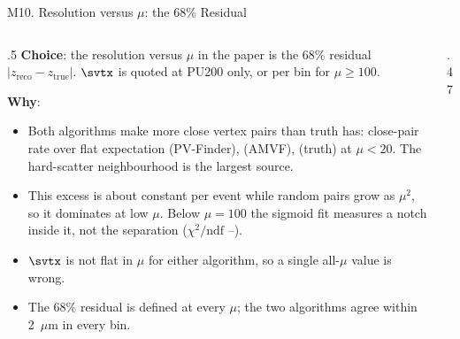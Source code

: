 \begin{frame}{M10. Resolution versus $\mu$: the 68\% Residual}
\footnotesize
\begin{columns}[T]
\begin{column}{.5\linewidth}
\textbf{Choice}: the resolution versus $\mu$ in the paper is the 68\% residual $|z_\mathrm{reco}-z_\mathrm{true}|$. $\svtx$ is quoted at PU200 only, or per bin for $\mu\ge100$.
\par\vspace{.4em}
\textbf{Why}:
\begin{itemize}\setlength\itemsep{.15em}
\item Both algorithms make more close vertex pairs than truth has: close-pair rate over flat expectation \rvmExcessPVF{} (PV-Finder), \rvmExcessAMVF{} (AMVF), \rvmExcessTruth{} (truth) at $\mu<20$. The hard-scatter neighbourhood is the largest source.
\item This excess is about constant per event while random pairs grow as $\mu^2$, so it dominates at low $\mu$. Below $\mu=100$ the sigmoid fit measures a notch inside it, not the separation ($\chi^2/\mathrm{ndf}$ \rvmChiLo--\rvmChiHi).
\item $\svtx$ is not flat in $\mu$ for either algorithm, so a single all-$\mu$ value is wrong.
\item The 68\% residual is defined at every $\mu$; the two algorithms agree within 2~$\mu$m in every bin.
\end{itemize}
\end{column}
\begin{column}{.47\linewidth}\centering
{}
\end{column}
\end{columns}
\vfill{}
\end{frame}
